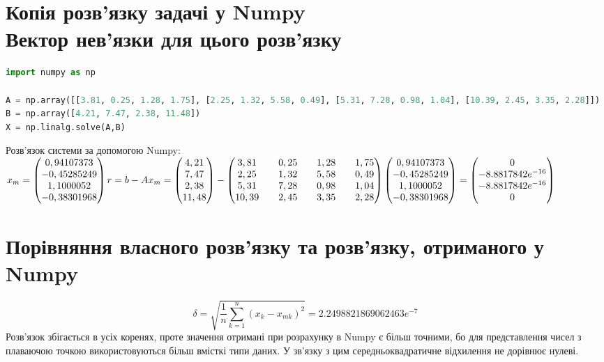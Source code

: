\documentclass{report}
\begin{document}
\section*{Копія розв’язку задачі у Numpy\\Вектор нев’язки для цього розв’язку}
\begin{lstlisting}[language=Python]
import numpy as np
    
A = np.array([[3.81, 0.25, 1.28, 1.75], [2.25, 1.32, 5.58, 0.49], [5.31, 7.28, 0.98, 1.04], [10.39, 2.45, 3.35, 2.28]])
B = np.array([4.21, 7.47, 2.38, 11.48])
X = np.linalg.solve(A,B)
\end{lstlisting}
Розв'язок системи за допомогою Numpy: $x_m = \begin{pmatrix}
0,94107373\\	
-0,45285249\\
1,1000052\\
-0,38301968\\
\end{pmatrix}\\
r = b - Ax_m = 
\begin{pmatrix}
4,21\\
7,47\\
2,38\\
11,48\\
\end{pmatrix} - \begin{pmatrix}
3,81 && 0,25 && 1,28 && 1,75\\
2,25 && 1,32 && 5,58 && 0,49\\
5,31 && 7,28 && 0,98 && 1,04\\
10,39 && 2,45 && 3,35 && 2,28\\
\end{pmatrix}\begin{pmatrix}
0,94107373\\
-0,45285249\\
1,1000052\\
-0,38301968\\
\end{pmatrix} = \begin{pmatrix}
0\\
-8.8817842e^{-16}\\
-8.8817842e^{-16}\\
0\\
\end{pmatrix}$

\section*{Порівняння власного розв’язку та розв’язку, отриманого у Numpy}
\[\delta=\sqrt{\frac{1}{n}\sum_{k=1}^{n} (x_k - x_{mk})^2} = 2.2498821869062463e^{-7}\]
Розв'язок збігається в усіх коренях, проте значення отримані при розрахунку в Numpy є більш точними, бо для представлення чисел з плаваючою точкою використовуються більш вмісткі типи даних. У зв'язку з цим середньоквадратичне відхилення не дорівнює нулеві.
\end{document}
